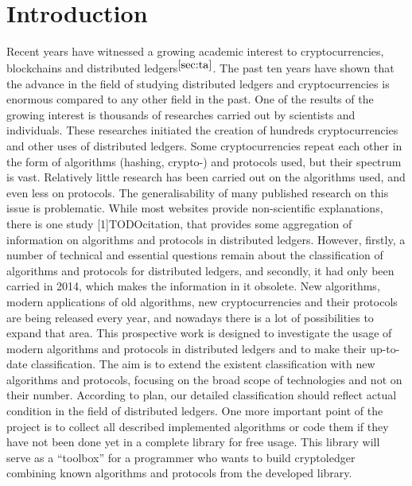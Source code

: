 \documentclass[12pt]{article}
\begin{document}
\section{Introduction}
Recent years have witnessed a growing academic interest to cryptocurrencies,
blockchains and distributed ledgers$^{\autoref{sec:ta}}$. The past ten years
have shown that the advance in the field of studying distributed ledgers and
cryptocurrencies is enormous compared to any other field in the past. One of
the results of the growing interest is thousands of researches carried out by
scientists and individuals. These researches initiated the creation of hundreds
cryptocurrencies and other uses of distributed ledgers. Some cryptocurrencies
repeat each other in the form of algorithms (hashing, crypto-) and protocols
used, but their spectrum is vast. Relatively little research has been carried
out on the algorithms used, and even less on protocols. The generalisability of
many published research on this issue is problematic. While most websites
provide non-scientific explanations, there is one study [1]TODOcitation, that
provides some aggregation of information on algorithms and protocols in
distributed ledgers. However, firstly, a number of technical and essential
questions remain about the classification of algorithms and protocols for
distributed ledgers, and secondly, it had only been carried in 2014, which
makes the information in it obsolete. New algorithms, modern applications of
old algorithms, new cryptocurrencies and their protocols are being released
every year, and nowadays there is a lot of possibilities to expand that area.
This prospective work is designed to investigate the usage of modern algorithms
and protocols in distributed ledgers and to make their up-to-date
classification. The aim is to extend the existent classification with new
algorithms and protocols, focusing on the broad scope of technologies and not
on their number.  According to plan, our detailed classification should reflect
actual condition in the field of distributed ledgers. One more important point
of the project is to collect all described implemented algorithms or code them
if they have not been done yet in a complete library for free usage. This
library will serve as a ``toolbox'' for a programmer who wants to build
cryptoledger combining known algorithms and protocols from the developed
library.

\end{document}

